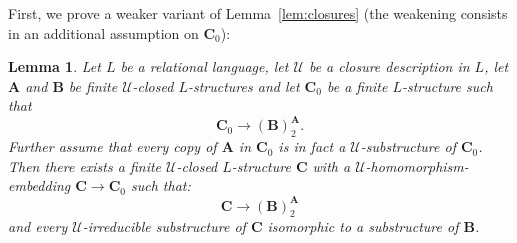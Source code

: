 \documentclass{elsarticle}
\def\str#1{\mathbf {#1}}
\theoremstyle{plain}
\newtheorem{lemma}[theorem]{Lemma}
\theoremstyle{definition}
\theoremstyle{remark}
\begin{document}
First, we prove a weaker variant of Lemma~\ref{lem:closures} (the weakening consists in an additional assumption on $\str{C}_0$):
\begin{lemma}\label{lem:preclosures}
Let $L$ be a relational language,
let $\mathcal U$ be a closure description in $L$, let $\str{A}$ and $\str{B}$ be finite $\mathcal U$-closed
$L$-structures and let $\str{C}_0$ be a finite $L$-structure such that
$$
\str{C}_0 \longrightarrow (\str{B})^{\str{A}}_2.
$$
Further assume that every copy of $\str{A}$ in $\str{C}_0$ is in fact a $\mathcal U$-substructure of $\str{C}_0$.
Then there exists a finite $\mathcal U$-closed $L$-structure $\str{C}$ with a $\mathcal U$-homomorphism-embedding $\str{C}\to \str{C}_0$ such that:
$$
\str{C} \longrightarrow (\str{B})^{\str{A}}_2
$$
and every $\mathcal U$-irreducible substructure of $\str{C}$ isomorphic to a substructure of $\str{B}$.
\end{lemma}
\end{document}
